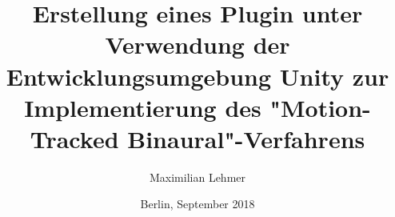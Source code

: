 
\newcommand*{\Title}{Erstellung eines Plugin unter Verwendung der Entwicklungsumgebung Unity zur Implementierung des "Motion-Tracked Binaural"-Verfahrens}
\newcommand*{\Autor}{Maximilian Lehmer}
\newcommand*{\Datum}{Berlin, September 2018}
\title{\Title}
\author{\Autor} 
\date{\Datum}


\newcommand{\tfk}[1]{\textsl{\texttt{#1}}}
\newcommand{\fett}[1]{\textbf{#1}}
\newcommand{\kursiv}[1]{\textit{#1}}
\newcommand{\pbb}{\parbox}
\newcommand{\sst}{\scriptstyle}

										
